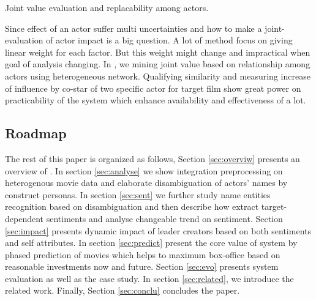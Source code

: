 \begin{difficulties} Joint value evaluation and replacability among actors.\end{difficulties}
\par Since effect of an actor suffer multi uncertainties and how to make a joint-evaluation of actor impact is a big question. A lot of method focus on giving linear weight for each factor. But this weight might change and impractical when goal of analysis changing. In \system, we mining joint value based on relationship among actors using heterogeneous network. Qualifying similarity and measuring increase of influence by co-star of two specific actor for target film show great power on practicability of the system which enhance availability and effectiveness of \system a lot. 

\subsection{Roadmap}
The rest of this paper is organized as follows, Section \ref{sec:overviw} presents an overview of \system. In section \ref{sec:analyse} we show integration preprocessing on heterogenous movie data and elaborate disambiguation of actors' names by construct personas. In section \ref{sec:sent} we further study name entities recognition based on disambiguation and then describe how \system extract target-dependent sentiments and analyse changeable trend on sentiment. Section \ref{sec:impact} presents dynamic impact of leader creators based on both sentiments and self attributes. In section \ref{sec:predict} present the core value of system by phased prediction of movies which helps to maximum box-office based on reasonable investments now and future. Section \ref{sec:evo} presents system evaluation as well as the case study. In section \ref{sec:related}, we introduce the related work. Finally, Section \ref{sec:conclu} concludes the paper. 